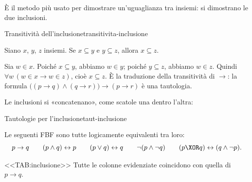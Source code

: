È il metodo più usato per dimostrare un'uguaglianza tra insiemi: si dimostrano le due inclusioni.

\begin{concetto}
\begin{Proposizione}{Transitività dell'inclusione}{transitivita-inclusione}
    \begin{prerequisiti}
    \end{prerequisiti}
    Siano $x$, $y$, $z$ insiemi. Se $x \subseteq y$ e $y \subseteq z$, allora $x \subseteq z$.
\end{Proposizione}
\begin{dimostrazione}
    Sia $w \in x$. Poiché $x \subseteq y$, abbiamo $w \in y$; poiché $y \subseteq z$, abbiamo $w \in z$.
    Quindi $\forall w\,(w \in x \rightarrow w \in z)$, cioè $x \subseteq z$. È la traduzione della transitività di
    $\rightarrow$: la formula $\big((p \rightarrow q) \wedge (q \rightarrow r)\big) \rightarrow (p \rightarrow r)$ è una tautologia.
\end{dimostrazione}
\end{concetto}

\begin{spiegazione}
    Le inclusioni si «concatenano», come scatole una dentro l'altra:
    \begin{center}
    \end{center}
\end{spiegazione}


\begin{concetto}
\begin{Lemma}{Tautologie per l'inclusione}{taut-inclusione}
    \begin{prerequisiti}
    \end{prerequisiti}
    Le seguenti FBF sono tutte logicamente equivalenti tra loro:
    \[ p \rightarrow q \qquad (p \wedge q) \leftrightarrow p \qquad (p \vee q) \leftrightarrow q \qquad \neg(p \wedge \neg q) \qquad (p \XOR q) \leftrightarrow (q \wedge \neg p). \]
\end{Lemma}
\begin{dimostrazione}
    <<TAB:inclusione>>
    Tutte le colonne evidenziate coincidono con quella di $p \rightarrow q$.
\end{dimostrazione}
\end{concetto}

